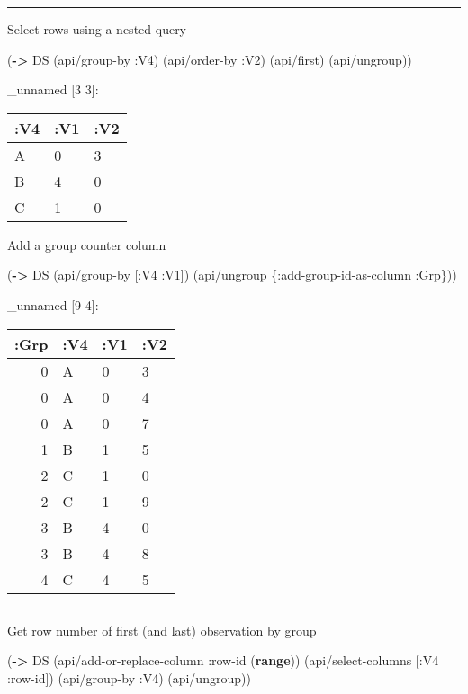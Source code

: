 \documentclass[]{article}
\newenvironment{Shaded}{\begin{snugshade}}{\end{snugshade}}
\newcommand{\KeywordTok}[1]{\textcolor[rgb]{0.13,0.29,0.53}{\textbf{#1}}}
\newcommand{\AttributeTok}[1]{\textcolor[rgb]{0.77,0.63,0.00}{#1}}
\newcommand{\NormalTok}[1]{#1}
\begin{document}
\begin{center}\rule{0.5\linewidth}{0.5pt}\end{center}

Select rows using a nested query

\begin{Shaded}
\begin{Highlighting}[]
\NormalTok{(}\KeywordTok{->}\NormalTok{ DS}
\NormalTok{    (api/group-by }\AttributeTok{:V4}\NormalTok{)}
\NormalTok{    (api/order-by }\AttributeTok{:V2}\NormalTok{)}
\NormalTok{    (api/first)}
\NormalTok{    (api/ungroup))}
\end{Highlighting}
\end{Shaded}

\_unnamed {[}3 3{]}:

\begin{longtable}[]{@{}lll@{}}
\toprule
:V4 & :V1 & :V2\tabularnewline
\midrule
\endhead
A & 0 & 3\tabularnewline
B & 4 & 0\tabularnewline
C & 1 & 0\tabularnewline
\bottomrule
\end{longtable}

Add a group counter column

\begin{Shaded}
\begin{Highlighting}[]
\NormalTok{(}\KeywordTok{->}\NormalTok{ DS}
\NormalTok{    (api/group-by [}\AttributeTok{:V4} \AttributeTok{:V1}\NormalTok{])}
\NormalTok{    (api/ungroup \{}\AttributeTok{:add-group-id-as-column} \AttributeTok{:Grp}\NormalTok{\}))}
\end{Highlighting}
\end{Shaded}

\_unnamed {[}9 4{]}:

\begin{longtable}[]{@{}rlll@{}}
\toprule
:Grp & :V4 & :V1 & :V2\tabularnewline
\midrule
\endhead
0 & A & 0 & 3\tabularnewline
0 & A & 0 & 4\tabularnewline
0 & A & 0 & 7\tabularnewline
1 & B & 1 & 5\tabularnewline
2 & C & 1 & 0\tabularnewline
2 & C & 1 & 9\tabularnewline
3 & B & 4 & 0\tabularnewline
3 & B & 4 & 8\tabularnewline
4 & C & 4 & 5\tabularnewline
\bottomrule
\end{longtable}

\begin{center}\rule{0.5\linewidth}{0.5pt}\end{center}

Get row number of first (and last) observation by group

\begin{Shaded}
\begin{Highlighting}[]
\NormalTok{(}\KeywordTok{->}\NormalTok{ DS}
\NormalTok{    (api/add-or-replace-column }\AttributeTok{:row-id}\NormalTok{ (}\KeywordTok{range}\NormalTok{))}
\NormalTok{    (api/select-columns [}\AttributeTok{:V4} \AttributeTok{:row-id}\NormalTok{])}
\NormalTok{    (api/group-by }\AttributeTok{:V4}\NormalTok{)}
\NormalTok{    (api/ungroup))}
\end{Highlighting}
\end{Shaded}
\end{document}
